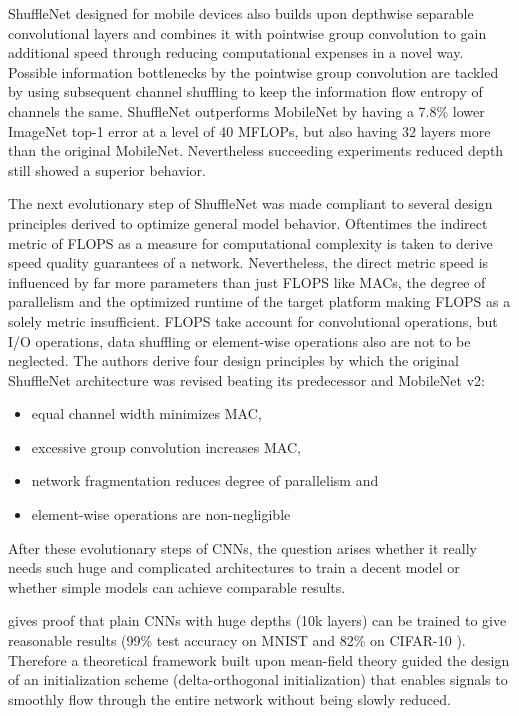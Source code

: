 ShuffleNet designed for mobile devices also builds upon depthwise separable convolutional layers and combines it with pointwise group convolution to gain additional speed through reducing computational expenses in a novel way. Possible information bottlenecks by the pointwise group convolution are tackled by using subsequent channel shuffling to keep the information flow entropy of channels the same. ShuffleNet outperforms MobileNet by having a 7.8\% lower ImageNet \cite{JiaDeng.2009} top-1 error at a level of 40 MFLOPs, but also having 32 layers more than the original MobileNet. Nevertheless succeeding experiments reduced depth still showed a superior behavior. \cite{XiangyuZhang.2017}

The next evolutionary step of ShuffleNet was made compliant to several design principles derived to optimize general model behavior. Oftentimes the indirect metric of FLOPS as a measure for computational complexity is taken to derive speed quality guarantees of a network. Nevertheless, the direct metric speed is influenced by far more parameters than just FLOPS like MACs, the degree of parallelism and the optimized runtime of the target platform making FLOPS as a solely metric insufficient. FLOPS take account for convolutional operations, but I/O operations, data shuffling or element-wise operations also are not to be neglected. The authors derive four design principles by which the original ShuffleNet architecture was revised beating its predecessor and MobileNet v2: \cite{NingningMa.2018}

\begin{itemize}
	\item equal channel width minimizes MAC, 
	\item excessive group convolution increases MAC, 
	\item network fragmentation reduces degree of parallelism and
	\item element-wise operations are non-negligible
\end{itemize}

After these evolutionary steps of CNNs, the question arises whether it really needs such huge and complicated architectures to train a decent model or whether simple models can achieve comparable results. 

\cite{Xiao.2018} gives proof that plain CNNs with huge depths (10k layers) can be trained to give reasonable results (99\% test accuracy on MNIST \cite{YannLeCun.1998} and 82\% on CIFAR-10 \cite{AlexKrizhevsky.2009}). Therefore a theoretical framework built upon mean-field theory guided the design of an initialization scheme (delta-orthogonal initialization) that enables signals to smoothly flow through the entire network without being slowly reduced. \cite{Xiao.2018} 

